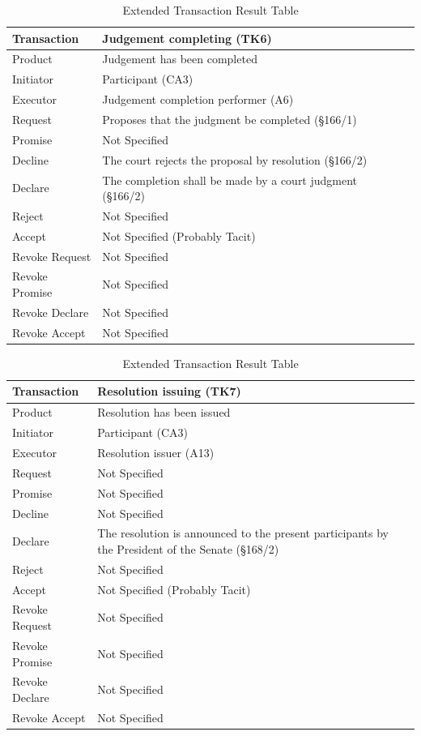 \begin{landscape}
\begin{table}[h]
\caption{Extended Transaction Result Table}
\label{tab:etrt}
\begin{tabular}{|l||l|l|}
\hline
Transaction  &  Judgement completing (TK6) \\ \hline
Product      &  Judgement has been completed \\ \hline
Initiator      & Participant (CA3)  \\ \hline
Executor       &  Judgement completion performer (A6) \\ \hline
Request        & Proposes that the judgment be completed (\S166/1)  \\ \hline
Promise        &  Not Specified    \\ \hline
Decline        &  The court rejects the proposal by resolution (\S166/2) \\ \hline
Declare        &  The completion shall be made by a court judgment (\S166/2)  \\ \hline
Reject         &  Not Specified   \\ \hline
Accept         & Not Specified (Probably Tacit) \\ \hline
Revoke Request & Not Specified       \\ \hline
Revoke Promise & Not Specified  \\ \hline
Revoke Declare & Not Specified      \\ \hline
Revoke Accept  &  Not Specified \\ \hline
\end{tabular}
\end{table}

\begin{table}[h]
\caption{Extended Transaction Result Table}
\label{tab:etrt}
\begin{tabular}{|l||l|l|}
\hline
Transaction  &  Resolution issuing (TK7) \\ \hline
Product      &   Resolution has been issued \\ \hline
Initiator      &  Participant (CA3) \\ \hline
Executor       &  Resolution issuer (A13) \\ \hline
Request        &  Not Specified \\ \hline
Promise        &  Not Specified  \\ \hline
Decline        &  Not Specified  \\ \hline
Declare        &  The resolution is announced to the present participants by the President of the Senate (\S168/2)  \\ \hline
Reject         &  Not Specified   \\ \hline
Accept         &  Not Specified (Probably Tacit) \\ \hline
Revoke Request &  Not Specified       \\ \hline
Revoke Promise &  Not Specified  \\ \hline
Revoke Declare &  Not Specified      \\ \hline
Revoke Accept  &  Not Specified \\ \hline
\end{tabular}
\end{table}


\end{landscape}
